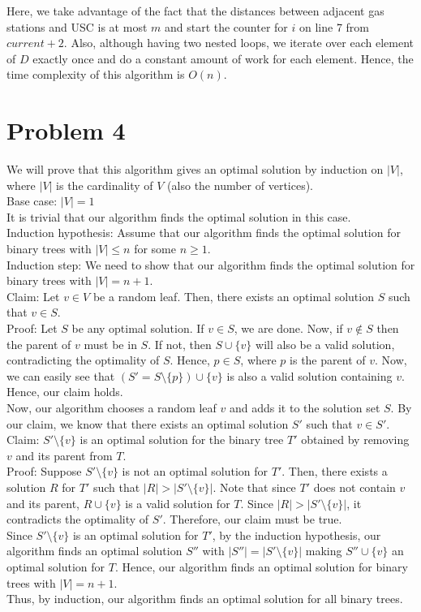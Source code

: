 \documentclass{article}
\begin{document}
  Here, we take advantage of the fact that the distances between adjacent gas stations and USC is at most $m$ and start the counter for $i$ on line 7 from $current + 2$.
  Also, although having two nested loops, we iterate over each element of $D$ exactly once and do a constant amount of work for each element.
  Hence, the time complexity of this algorithm is $O(n)$.

\section{Problem 4}
  We will prove that this algorithm gives an optimal solution by induction on $|V|$, where $|V|$ is the cardinality of $V$ (also the number of vertices). \\
  Base case: $|V| = 1$ \\
  It is trivial that our algorithm finds the optimal solution in this case. \\
  Induction hypothesis: Assume that our algorithm finds the optimal solution for binary trees with $|V| \le n$ for some $n \geq 1$. \\
  Induction step: We need to show that our algorithm finds the optimal solution for binary trees with $|V| = n + 1$. \\
  Claim: Let $v \in V$ be a random leaf.
  Then, there exists an optimal solution $S$ such that $v \in S$. \\
  Proof: Let $S$ be any optimal solution.
  If $v \in S$, we are done.
  Now, if $v \notin S$ then the parent of $v$ must be in $S$.
  If not, then $S \cup \{v\}$ will also be a valid solution, contradicting the optimality of $S$.
  Hence, $p \in S$, where $p$ is the parent of $v$.
  Now, we can easily see that $(S' = S \setminus \{p\}) \cup \{v\}$ is also a valid solution containing $v$.
  Hence, our claim holds. \\
  Now, our algorithm chooses a random leaf $v$ and adds it to the solution set $S$.
  By our claim, we know that there exists an optimal solution $S'$ such that $v \in S'$. \\
  Claim: $S' \setminus \{v\}$ is an  optimal solution for the binary tree $T'$ obtained by removing $v$ and its parent from $T$. \\
  Proof: Suppose $S' \setminus \{v\}$ is not an optimal solution for $T'$.
  Then, there exists a solution $R$ for $T'$ such that $|R| > |S' \setminus \{v\}|$.
  Note that since $T'$ does not contain $v$ and its parent, $R \cup \{v\}$ is a valid solution for $T$.
  Since $|R| > |S' \setminus \{v\}|$, it contradicts the optimality of $S'$.
  Therefore, our claim must be true. \\
  Since $S' \setminus \{v\}$ is an optimal solution for $T'$, by the induction hypothesis, our algorithm finds an optimal solution $S''$ with $|S''| = |S' \setminus \{v\}|$ making $S'' \cup \{v\}$ an optimal solution for $T$.
  Hence, our algorithm finds an optimal solution for binary trees with $|V| = n + 1$. \\
  Thus, by induction, our algorithm finds an optimal solution for all binary trees. \\
\end{document}
